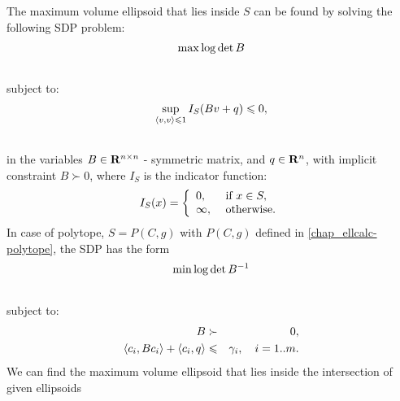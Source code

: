 \documentclass[letterpaper,10pt,english]{sphinxmanual}
\begin{document}
The maximum volume ellipsoid that lies inside $S$ can be found by
solving the following SDP problem:
\begin{gather}
\begin{split}\max \log \det B\end{split}\notag\\\begin{split}\end{split}\notag
\end{gather}
subject to:
\begin{gather}
\begin{split}\sup_{\langle v,v\rangle\leqslant1} I_S(Bv+q)\leqslant0 ,\end{split}\notag\\\begin{split}\end{split}\notag
\end{gather}
in the variables $B\in{\bf R}^{n\times n}$ - symmetric matrix,
and $q\in{\bf R}^n$, with implicit constraint $B\succ 0$,
where $I_S$ is the indicator function:
\begin{gather}
\begin{split}I_S(x) = \left\{\begin{array}{ll}
0, & \mbox{ if } x\in S,\\
\infty, & \mbox{ otherwise.}\end{array}\right.\end{split}\notag
\end{gather}
In case of polytope, $S=P(C,g)$ with $P(C,g)$ defined in
\eqref{chap_ellcalc-polytope}, the SDP has the form
\begin{gather}
\begin{split}\min \log \det B^{-1}\end{split}\notag\\\begin{split}\end{split}\notag
\end{gather}
subject to:
\begin{gather}
\begin{split}\begin{aligned}
B & \succ & 0,\\
\langle c_i, Bc_i\rangle + \langle c_i, q\rangle & \leqslant& \gamma_i,
~~~ i=1..m.\end{aligned}\end{split}\notag
\end{gather}
We can find the maximum volume ellipsoid that lies inside the
intersection of given ellipsoids
\end{document}
